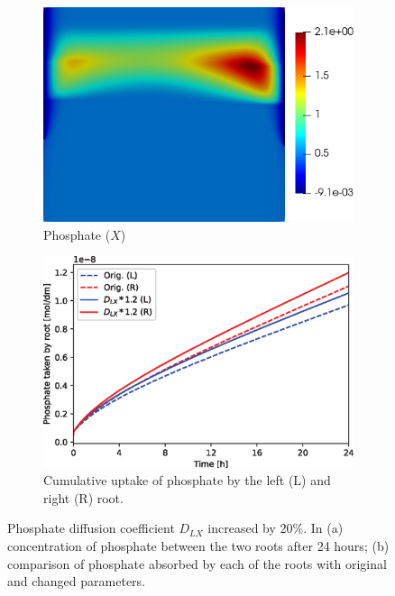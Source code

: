 \documentclass[11pt]{article}
\numberwithin{equation}{section}
\begin{document}
\begin{figure}[!htb]
\centering
\begin{subfigure}[t]{0.45\textwidth}
    \includegraphics[trim= 100 100 60 100,width=\textwidth]{Figures/X_DXup20.png}
    \caption{Phosphate ($X$)}
    \label{fig:numexp_DLXup1}
\end{subfigure}
\qquad
\begin{subfigure}[t]{0.45\textwidth}
    \includegraphics[width=\textwidth]{Figures/DXup20.eps}
    \caption{Cumulative uptake of phosphate by the left (L) and right (R) root.}
    \label{fig:numexp_DLXup2}
\end{subfigure}

\caption{Phosphate diffusion coefficient $D_{LX}$ increased by 20\%. In (a) concentration of phosphate between the two roots after 24 hours; (b) comparison of phosphate absorbed by each of the roots with original and changed parameters.}
\label{fig:numexp_DLXup}
\end{figure}
\end{document}
